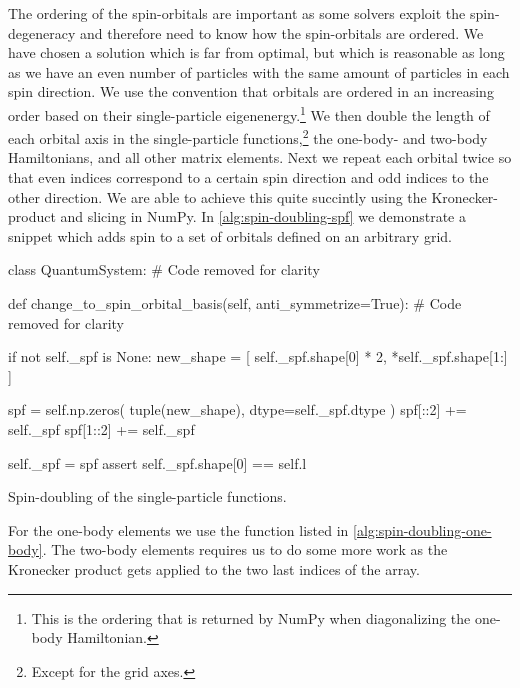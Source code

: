         The ordering of the spin-orbitals are important as some solvers
        exploit the spin-degeneracy and therefore need to know how the
        spin-orbitals are ordered.
        We have chosen a solution which is far from optimal, but which is
        reasonable as long as we have an even number of particles with the same
        amount of particles in each spin direction.
        We use the convention that orbitals are ordered in an increasing order
        based on their single-particle eigenenergy.\footnote{%
            This is the ordering that is returned by NumPy when diagonalizing
            the one-body Hamiltonian.
        }
        We then double the length of each orbital axis in the single-particle
        functions,\footnote{%
            Except for the grid axes.
        } the one-body- and two-body Hamiltonians, and all other matrix
        elements.
        Next we repeat each orbital twice so that even indices correspond to a
        certain spin direction and odd indices to the other direction.
        We are able to achieve this quite succintly using the Kronecker-product
        and slicing in NumPy.
        In \autoref{alg:spin-doubling-spf} we demonstrate a snippet which adds
        spin to a set of orbitals defined on an arbitrary grid.
        \begin{algorithm}
            \begin{python}
class QuantumSystem:
    # Code removed for clarity

    def change_to_spin_orbital_basis(self, anti_symmetrize=True):
        # Code removed for clarity

        if not self._spf is None:
            new_shape = [
                self._spf.shape[0] * 2, *self._spf.shape[1:]
            ]

            spf = self.np.zeros(
                tuple(new_shape), dtype=self._spf.dtype
            )
            spf[::2] += self._spf
            spf[1::2] += self._spf

            self._spf = spf
            assert self._spf.shape[0] == self.l
            \end{python}
            \caption{Spin-doubling of the single-particle functions.}
            \label{alg:spin-doubling-spf}
        \end{algorithm}
        For the one-body elements we use the function listed in
        \autoref{alg:spin-doubling-one-body}.
        The two-body elements requires us to do some more work as the Kronecker
        product gets applied to the two last indices of the array.
